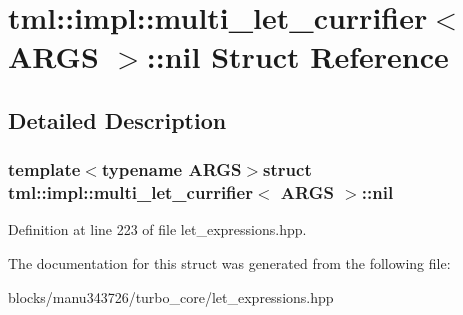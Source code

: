 \hypertarget{structtml_1_1impl_1_1multi__let__currifier_1_1nil}{\section{tml\+:\+:impl\+:\+:multi\+\_\+let\+\_\+currifier$<$ A\+R\+G\+S $>$\+:\+:nil Struct Reference}
\label{structtml_1_1impl_1_1multi__let__currifier_1_1nil}
}


\subsection{Detailed Description}
\subsubsection*{template$<$typename A\+R\+G\+S$>$struct tml\+::impl\+::multi\+\_\+let\+\_\+currifier$<$ A\+R\+G\+S $>$\+::nil}



Definition at line 223 of file let\+\_\+expressions.\+hpp.



The documentation for this struct was generated from the following file\+:\begin{DoxyCompactItemize}
\item 
blocks/manu343726/turbo\+\_\+core/let\+\_\+expressions.\+hpp\end{DoxyCompactItemize}
